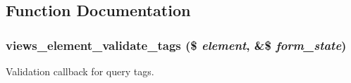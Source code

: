 \subsection{Function Documentation}
\hypertarget{views__plugin__query__default_8inc_a171eb458045ffb67300a100fcef09015}{
\subsubsection[{views\_\-element\_\-validate\_\-tags}]{\setlength{\rightskip}{0pt plus 5cm}views\_\-element\_\-validate\_\-tags (\$ {\em element}, \/  \&\$ {\em form\_\-state})}}
\label{views__plugin__query__default_8inc_a171eb458045ffb67300a100fcef09015}
Validation callback for query tags. 